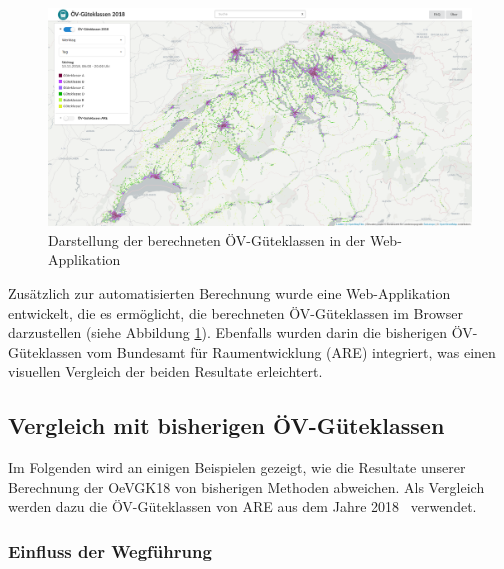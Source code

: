 \begin{landscape}
\begin{figure}[ht]
    \centering
    \includegraphics[width=1\linewidth]{technicalreport/img/resultat_oevgk18_uebersicht}
    \caption[Darstellung der berechneten ÖV-Güteklassen in der Web-Applikation]{Darstellung der berechneten ÖV-Güteklassen in der Web-Applikation}
    \label{fig:resultat_webapp_uebersicht}
\end{figure}
\end{landscape}

Zusätzlich zur automatisierten Berechnung wurde eine Web-Applikation entwickelt, die es ermöglicht, die berechneten \gls{ÖV-Güteklassen} im Browser darzustellen (siehe Abbildung \ref{fig:resultat_webapp_uebersicht}).
Ebenfalls wurden darin die bisherigen \gls{ÖV-Güteklassen} vom Bundesamt für Raumentwicklung (\acs{ARE}) integriert, was einen visuellen Vergleich der beiden Resultate erleichtert.

\subsection{Vergleich mit bisherigen ÖV-Güteklassen}
\label{Resultate:Vergleich mit bisherigen ÖV-Güteklassen}

Im Folgenden wird an einigen Beispielen gezeigt, wie die Resultate unserer Berechnung der \gls{OeVGK18} von bisherigen Methoden abweichen.
Als Vergleich werden dazu die \gls{ÖV-Güteklassen} von \ac{ARE} aus dem Jahre 2018~\cite{berechnung_are} verwendet.

\subsubsection{Einfluss der Wegführung}

